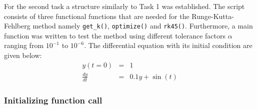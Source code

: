 \documentclass{aa}
\begin{document}
For the second task a structure similarly to Task 1 was established. The script consists of
three functional functions that are needed for the Runge-Kutta-Fehlberg method namely
\verb+get_k()+, \verb+optimize()+ and \verb+rk45()+. Furthermore, a main function was written
to test the method using different tolerance factors \(\alpha\) ranging from \(10^{-1}\) to
\(10^{-6}\). The differential equation with its initial condition are given below:
\begin{eqnarray}
    \label{equ:init_cond_2}
    y(t=0) & = & 1 \\ \label{equ:ode_2}
    \frac{dy}{dt} & = & 0.1 y + \sin(t)
\end{eqnarray}

\subsubsection*{Initializing function call}%
\label{ssub:general_function_call}
\end{document}
